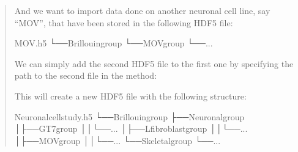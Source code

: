 \documentclass[letterpaper,10pt,english]{sphinxmanual}
\begin{document}
\begin{itemize}
\begin{quote}
\sphinxAtStartPar
And we want to import data done on another neuronal cell line, say “MOV”, that have been stored in the following HDF5 file:

\begin{sphinxVerbatim}[commandchars=\\\{\}]
MOV.h5
└──Brillouingroup
└──MOVgroup
└──...
\end{sphinxVerbatim}

\sphinxAtStartPar
We can simply add the second HDF5 file to the first one by specifying the path to the second file in the  method:

\begin{sphinxVerbatim}[commandchars=\\\{\}]
    
     
\end{sphinxVerbatim}

\sphinxAtStartPar
This will create a new HDF5 file with the following structure:

\begin{sphinxVerbatim}[commandchars=\\\{\}]
Neuronal\PYGZus{}cell\PYGZus{}study.h5
└──Brillouingroup
├──Neuronalgroup
│├──GT\PYGZhy{}7group
││└──...
│├──L\PYGZhy{}fibroblastgroup
││└──...
│├──MOVgroup
││└──...
└──Skeletalgroup
└──...
\end{sphinxVerbatim}
\end{quote}

\end{itemize}
\end{document}
